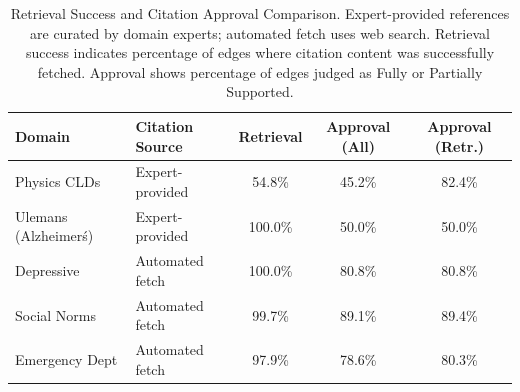 \begin{table}[H]
\centering
\small
\caption{Retrieval Success and Citation Approval Comparison. Expert-provided references are curated by domain experts; automated fetch uses web search. Retrieval success indicates percentage of edges where citation content was successfully fetched. Approval shows percentage of edges judged as Fully or Partially Supported.}
\label{tab:retrieval-comparison}
\begin{tabular}{llccc}
\toprule
\textbf{Domain} & \textbf{Citation Source} & \textbf{Retrieval} & \textbf{Approval (All)} & \textbf{Approval (Retr.)} \\
\midrule
Physics CLDs & Expert-provided & 54.8\% & 45.2\% & 82.4\% \\
Ulemans (Alzheimer\'s) & Expert-provided & 100.0\% & 50.0\% & 50.0\% \\
Depressive & Automated fetch & 100.0\% & 80.8\% & 80.8\% \\
Social Norms & Automated fetch & 99.7\% & 89.1\% & 89.4\% \\
Emergency Dept & Automated fetch & 97.9\% & 78.6\% & 80.3\% \\
\bottomrule
\end{tabular}
\end{table}

